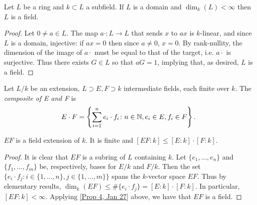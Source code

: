 \begin{prop}\label{Prop 4, Jan 27}
Let $L$ be a ring and $k \subset L$ a subfield. If $L$ is a domain and $\dim_k(L) < \infty$ then $L$ is a field.
\end{prop}
\begin{proof}
Let $0 \neq a \in L$. The map $a \cdot \colon L \rightarrow L$ that sends $x$ to $ax$ is $k$-linear, and since $L$ is a domain, injective: if $ax = 0$ then since $a \neq 0$, $x = 0$. By rank-nullity, the dimension of the image of $a \cdot$ must be equal to that of the target, i.e. $a \cdot$ is surjective. Thus there exists $G \in L$ so that $aG = 1$, implying that, as desired, $L$ is a field.
\end{proof}

\begin{defn} \label{Defn 5, Jan 27}
Let $L/k$ be an extension, $L \supset E, F \supset k$ intermediate fields, each finite over $k$. The \textit{composite of E and F} is
\[E \cdot F = \left\{ \sum_{i = 1}^n e_i \cdot f_i \colon n \in \mathbb{N}, e_i \in E, f_i \in F \right\}.\]
\end{defn}

\begin{prop} \label{Prop 6, Jan 27}
$EF$ is a field extension of $k$. It is finite and $[EF : k] \leq [E : k] \cdot [F : k]$.
\end{prop}
\begin{proof}
It is clear that $EF$ is a subring of $L$ containing $k$. Let $\{e_1, ..., e_n\}$ and $\{f_1, ..., f_m\}$ be, respectively, bases for $E/k$ and $F/k$. Then the set $\{e_i \cdot f_j \colon i \in \{1, ..., n\}, j \in \{1, ..., m\}\}$ spans the $k$-vector space $EF$. Thus by elementary results, $\dim_k(EF) \leq \#\{e_i \cdot f_j\} = [E : k] \cdot [F : k]$. In particular, $[EF : k] < \infty$. Applying \ref{Prop 4, Jan 27} above, we have that $EF$ is a field.
\end{proof}

